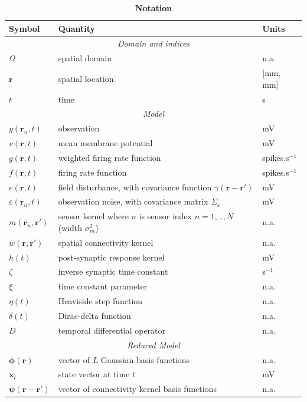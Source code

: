 \documentclass[10pt]{article}
\begin{document}
\begin{table}[!ht]
\caption{
\bf{Notation}}
\begin{tabular}{|l|l|l|}
	\hline
	\textbf{Symbol} & \textbf{Quantity} & \textbf{Units}\\
	\hline
	\multicolumn{3}{|c|}{\emph{Domain and indices}}\\
	\hline
	$\Omega$ & spatial domain & n.a.\\
	$\mathbf{r}$ & spatial location & [mm, mm]\\
	$t$ & time & s\\
	\hline
	\multicolumn{3}{|c|}{\emph{Model}}\\
	\hline
    $y(\mathbf{r}_n,t)$ & observation & mV\\
    $v(\mathbf{r},t)$ & mean membrane potential & mV \\
	$g(\mathbf{r},t)$ & weighted firing rate function & spikes.s$^{-1}$\\
	$f(\mathbf{r},t)$ & firing rate function & spikes.s$^{-1}$\\
	$e(\mathbf{r},t)$ & field disturbance, with covariance function $\gamma(\mathbf r-\mathbf r')$ & mV\\
	$\varepsilon(\mathbf{r}_n,t)$ & observation noise, with covariance matrix $\Sigma_\varepsilon$ & mV\\
	$m(\mathbf{r}_n,\mathbf{r}')$ & sensor kernel where $n$ is sensor index $n=1,..,N$ (width $\sigma_m^2$) & n.a. \\
	$w(\mathbf{r},\mathbf{r}')$ & spatial connectivity kernel & n.a.\\
	$h(t)$ & post-synaptic response kernel & mV\\
	$\zeta$ & inverse synaptic time constant & s$^{-1}$\\
	$\xi$ & time constant parameter & n.a.\\
	$\eta(t)$ & Heaviside step function & n.a.\\
	$\delta(t)$ & Dirac-delta function & n.a.\\
	$D$ & temporal differential operator & n.a.\\
	\hline
	\multicolumn{3}{|c|}{\emph{Reduced Model}} \\
	\hline
   	$\boldsymbol\phi(\mathbf{r})$ & vector of $L$ Gaussian basis functions & n.a.\\
   	$\mathbf{x}_t$ & state vector at time $t$ & mV\\
   	$\boldsymbol{\psi}(\mathbf{r}-\mathbf{r}')$ & vector of connectivity kernel basis functions & n.a.\\

\end{tabular}
\end{table}
\end{document}
